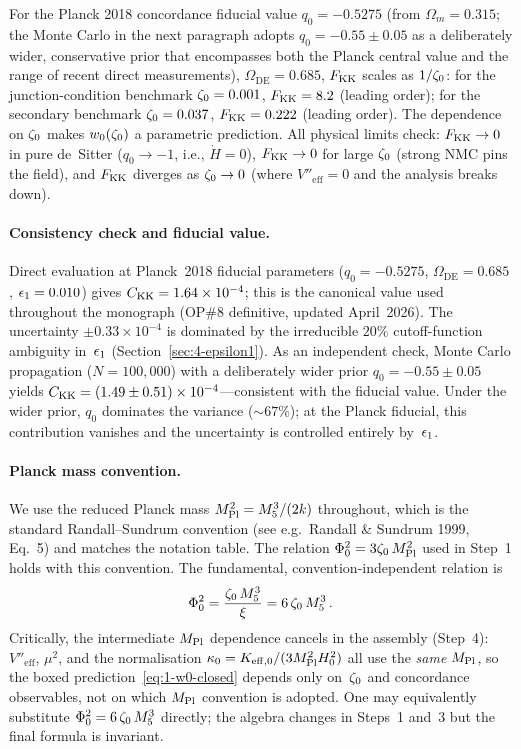 For the Planck 2018 concordance fiducial value $q_0 = -0.5275$ (from $\Omega_m = 0.315$; the Monte Carlo in the next paragraph adopts $q_0 = -0.55 \pm 0.05$ as a deliberately wider, conservative prior that encompasses both the Planck central value and the range of recent direct measurements), $\Omega_{\mathrm{DE}} = 0.685$, $F_{\mathrm{KK}}$ scales as $1/\zeta_0$: for the junction-condition benchmark $\zeta_0 = 0.001$, $F_{\mathrm{KK}} = 8.2$ (leading order); for the secondary benchmark $\zeta_0 = 0.037$, $F_{\mathrm{KK}} = 0.222$ (leading order). The dependence on $\zeta_0$ makes $w_0(\zeta_0)$ a parametric prediction. All physical limits check: $F_{\mathrm{KK}} \to 0$ in pure de~Sitter ($q_0 \to -1$, i.e., $\dot{H} = 0$), $F_{\mathrm{KK}} \to 0$ for large $\zeta_0$ (strong NMC pins the field), and $F_{\mathrm{KK}}$ diverges as $\zeta_0 \to 0$ (where $V''_{\mathrm{eff}} = 0$ and the analysis breaks down).

\paragraph{Consistency check and fiducial value.} Direct evaluation at Planck~2018 fiducial parameters ($q_0 = -0.5275$, $\Omega_{\mathrm{DE}} = 0.685$, $\epsilon_1 = 0.010$) gives $C_{\mathrm{KK}} = 1.64 \times 10^{-4}$; this is the canonical value used throughout the monograph (OP\#8 definitive, updated April~2026). The uncertainty $\pm 0.33 \times 10^{-4}$ is dominated by the irreducible $20\%$ cutoff-function ambiguity in~$\epsilon_1$ (Section~\ref{sec:4-epsilon1}). As an independent check, Monte Carlo propagation ($N = 100{,}000$) with a deliberately wider prior $q_0 = -0.55 \pm 0.05$ yields $C_{\mathrm{KK}} = (1.49 \pm 0.51) \times 10^{-4}$---consistent with the fiducial value. Under the wider prior, $q_0$ dominates the variance (${\sim}67\%$); at the Planck fiducial, this contribution vanishes and the uncertainty is controlled entirely by~$\epsilon_1$.

\paragraph{Planck mass convention.} We use the reduced Planck mass $M_{\mathrm{Pl}}^2 = M_5^3/(2k)$ throughout, which is the standard Randall--Sundrum convention (see e.g.\ Randall \& Sundrum 1999, Eq.~5) and matches the notation table. The relation $\Phi_0^2 = 3\zeta_0\,M_{\mathrm{Pl}}^2$ used in Step~1 holds with this convention. The fundamental, convention-independent relation is
\begin{equation}
\label{eq:1-phi0-fundamental}
\Phi_0^2 = \frac{\zeta_0\,M_5^3}{\xi} = 6\,\zeta_0\,M_5^3\,.
\end{equation}
Critically, the intermediate $M_{\mathrm{Pl}}$ dependence cancels in the assembly (Step~4): $V''_{\mathrm{eff}}$, $\mu^2$, and the normalisation $\kappa_0 = K_{\mathrm{eff},0}/(3M_{\mathrm{Pl}}^2 H_0^2)$ all use the \emph{same} $M_{\mathrm{Pl}}$, so the boxed prediction~\eqref{eq:1-w0-closed} depends only on~$\zeta_0$ and concordance observables, not on which $M_{\mathrm{Pl}}$ convention is adopted. One may equivalently substitute $\Phi_0^2 = 6\,\zeta_0\,M_5^3$ directly; the algebra changes in Steps~1 and~3 but the final formula is invariant.

